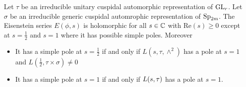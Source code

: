     \begin{Theorem}
        Let \(\tau\) be an irreducible unitary cuspidal automorphic representation of \(\operatorname{GL}_r\). Let \(\sigma\) be an irreducible generic cuspidal automrophic representation of \(\operatorname{Sp}_{2m}\). The Eisenstein series \(E(\phi, s)\) is holomorphic for all \(s\in \C\) with \(\mathrm{Re}(s)\geq 0\) except at \(s = \frac{1}{2}\) and \(s= 1\) where it has possible simple poles. Moreover 
       	\begin{itemize}
       		\item It has a simple pole at \(s= \frac{1}{2}\) if and only if \(L(s, \tau, \wedge^2)\) has a pole at \(s=1\) and \(L(\frac{1}{2}, \tau\times \sigma)\neq 0\)
       		\item It has a simple pole at \(s=1\) if and only if \(L(s, \tau\time \sigma)\) has a pole at \(s=1\).
       	\end{itemize}
    \end{Theorem}
     